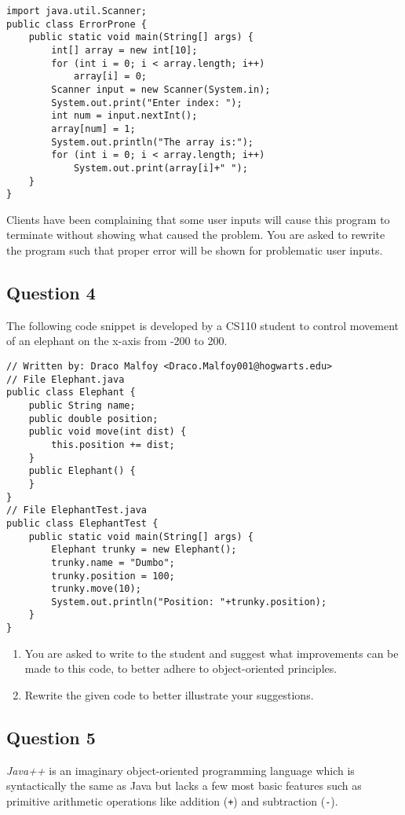 \begin{lstlisting}
import java.util.Scanner;
public class ErrorProne {
	public static void main(String[] args) {
		int[] array = new int[10];
		for (int i = 0; i < array.length; i++)
			array[i] = 0;
		Scanner input = new Scanner(System.in);
		System.out.print("Enter index: ");
		int num = input.nextInt();
		array[num] = 1;
		System.out.println("The array is:");
		for (int i = 0; i < array.length; i++)
			System.out.print(array[i]+" ");
	}
}
\end{lstlisting}

Clients have been complaining that some user inputs will cause this program to terminate without showing what caused the problem. You are asked to rewrite the program such that proper error will be shown for problematic user inputs.
\newpage
\subsection*{Question 4}
The following code snippet is developed by a CS110 student to control movement of an elephant on the x-axis from -200 to 200.
\begin{lstlisting}
// Written by: Draco Malfoy <Draco.Malfoy001@hogwarts.edu>
// File Elephant.java
public class Elephant {
	public String name;
	public double position;
	public void move(int dist) {
		this.position += dist;
	}
	public Elephant() {
	}
}
// File ElephantTest.java
public class ElephantTest {
	public static void main(String[] args) {
		Elephant trunky = new Elephant();
		trunky.name = "Dumbo";
		trunky.position = 100;
		trunky.move(10);
		System.out.println("Position: "+trunky.position);
	}
}
\end{lstlisting}
\begin{enumerate}[label=(\alph*)]\itemsep=0pt
\item You are asked to write to the student and suggest what improvements can be made to this code, to better adhere to object-oriented principles.
\item Rewrite the given code to better illustrate your suggestions.
\end{enumerate}


\newpage
\subsection*{Question 5}
\textit{Java++} is an imaginary object-oriented programming language which is syntactically the same as Java but lacks a few most basic features such as primitive arithmetic operations like addition (\texttt{+}) and subtraction (\texttt{-}).

